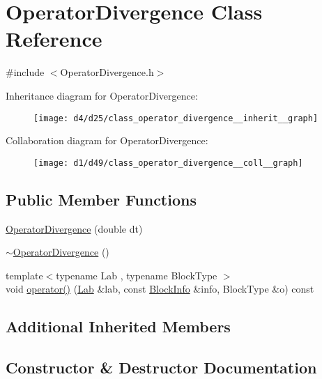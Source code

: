 \hypertarget{class_operator_divergence}{}\section{Operator\+Divergence Class Reference}
\label{class_operator_divergence}


{\ttfamily \#include $<$Operator\+Divergence.\+h$>$}



Inheritance diagram for Operator\+Divergence\+:\nopagebreak
\begin{figure}[H]
\begin{center}
\leavevmode
\texttt{[image: d4/d25/class\_operator\_divergence\_\_inherit\_\_graph]}
\end{center}
\end{figure}


Collaboration diagram for Operator\+Divergence\+:\nopagebreak
\begin{figure}[H]
\begin{center}
\leavevmode
\texttt{[image: d1/d49/class\_operator\_divergence\_\_coll\_\_graph]}
\end{center}
\end{figure}
\subsection*{Public Member Functions}
\begin{DoxyCompactItemize}
\item 
\hyperlink{class_operator_divergence_a92331667e69c3d2bd224e018aabd468e}{Operator\+Divergence} (double dt)
\item 
\hyperlink{class_operator_divergence_a52a4ddc9c34920a5bb89bfa11e22fba1}{$\sim$\+Operator\+Divergence} ()
\item 
{\footnotesize template$<$typename Lab , typename Block\+Type $>$ }\\void \hyperlink{class_operator_divergence_a84b0abc1e4b1dc921c144a08cb3059a7}{operator()} (\hyperlink{_definitions_8h_ad6f951af9a2a6ebc1975404882b34314}{Lab} \&lab, const \hyperlink{struct_block_info}{Block\+Info} \&info, Block\+Type \&o) const 
\end{DoxyCompactItemize}
\subsection*{Additional Inherited Members}


\subsection{Constructor \& Destructor Documentation}
\hypertarget{class_operator_divergence_a92331667e69c3d2bd224e018aabd468e}{}
